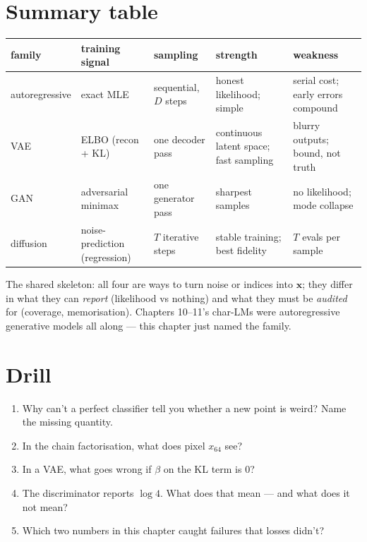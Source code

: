 \section{Summary table}
\label{sec:gensummary}

\begin{center}\small
\begin{tabular}{p{2.6cm}p{2.5cm}p{2.9cm}p{2.9cm}p{2.2cm}}
\toprule
family & training signal & sampling & strength & weakness \\
\midrule
autoregressive & exact MLE & sequential, $D$ steps & honest likelihood; simple & serial cost; early errors compound \\
VAE & ELBO (recon + KL) & one decoder pass & continuous latent space; fast sampling & blurry outputs; bound, not truth \\
GAN & adversarial minimax & one generator pass & sharpest samples & no likelihood; mode collapse \\
diffusion & noise-prediction (regression) & $T$ iterative steps & stable training; best fidelity & $T$ evals per sample \\
\bottomrule
\end{tabular}
\end{center}

The shared skeleton: all four are ways to turn noise or indices into
$\mathbf x$; they differ in what they can \emph{report} (likelihood vs
nothing) and what they must be \emph{audited} for (coverage,
memorisation). Chapters 10--11's char-LMs were autoregressive
generative models all along --- this chapter just named the family.

\section*{Drill}
\begin{enumerate}
\item Why can't a perfect classifier tell you whether a new point is
weird? Name the missing quantity.
\item In the chain factorisation, what does pixel $x_{64}$ see?
\item In a VAE, what goes wrong if $\beta$ on the KL term is $0$?
\item The discriminator reports $\log 4$. What does that mean --- and
what does it not mean?
\item Which two numbers in this chapter caught failures that losses
didn't?
\end{enumerate}

